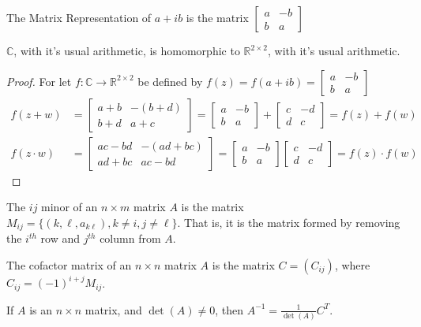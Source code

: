             \begin{definition}
            The Matrix Representation of $a+ib$ is the matrix $\begin{bmatrix}a & -b \\ b & a \end{bmatrix}$
            \end{definition}
            \begin{theorem}
            $\mathbb{C}$, with it's usual arithmetic, is homomorphic to $\mathbb{R}^{2\times 2}$, with it's usual arithmetic.
            \end{theorem}
            \begin{proof}
            For let $f:\mathbb{C}\rightarrow\mathbb{R}^{2\times 2}$ be defined by $f(z) = f(a+ib) = \begin{bmatrix}a & -b\\b & a\end{bmatrix}$
            \begin{align*}
                f(z+w)&=\begin{bmatrix}a+b & -(b+d)\\b+d& a+c\end{bmatrix}=\begin{bmatrix}a&-b\\b&a\end{bmatrix}+\begin{bmatrix}c&-d\\d&c\end{bmatrix}=f(z)+f(w)\\
                f(z\cdot w)&=\begin{bmatrix}ac-bd&-(ad+bc)\\ad+bc&ac-bd\end{bmatrix}=\begin{bmatrix}a&-b\\b&a\end{bmatrix}\begin{bmatrix}c&-d\\d&c\end{bmatrix}=f(z)\cdot f(w)
            \end{align*}
            \end{proof}
            \begin{definition}
            The $ij$ minor of an $n\times m$ matrix $A$ is the matrix $M_{ij}=\{(k,\ell,a_{k\ell}),k\ne i,j\ne\ell\}$. That is, it is the matrix formed by removing the $i^{th}$ row and $j^{th}$ column from $A$.
            \end{definition}
            \begin{definition}
            The cofactor matrix of an $n\times n$ matrix $A$ is the matrix $C=(C_{ij})$, where $C_{ij}=(-1)^{i+j}M_{ij}$.
            \end{definition}
            \begin{theorem}
            If $A$ is an $n\times n$ matrix, and $\det(A) \ne 0$, then $A^{-1}= \frac{1}{\det(A)}C^{T}$.
            \end{theorem}
